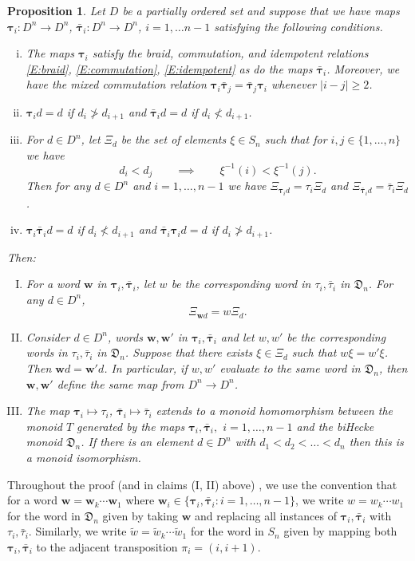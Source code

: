 \documentclass[11pt]{article}
\newcommand{\bw}{\mathbf{w}}
\newtheorem{proposition}[theorem]{Proposition}
\theoremstyle{definition} %
\theoremstyle{remark} %
\newcommand{\btau}{{\boldsymbol \tau}}
\newcommand{\bbtau}{\bar {\boldsymbol \tau}}
\begin{document}
\begin{proposition}
	\label{p:semigroup-isom}
	Let $D$ be a partially ordered set and suppose that we have maps $\btau_i:D^n \to D^n$, $\bbtau_i:D^n \to D^n$, $i=1,\ldots n-1$ satisfying the following conditions.
	\begin{enumerate}[(i)]
		\item The maps $\btau_i$ satisfy the braid, commutation, and idempotent relations \eqref{E:braid}, \eqref{E:commutation}, \eqref{E:idempotent} as do the maps $\bbtau_i$. Moreover, we have the mixed commutation relation $\btau_i \bbtau_j = \bbtau_j \btau_i$ whenever $|i-j| \ge 2$.
		\item $\btau_i d=d$ if $d_i \not > d_{i+1}$ and $\bbtau_i d=d$ if $d_i \not < d_{i+1}$.
		\item For $d \in D^n$, let $\Xi_d$ be the set of elements $\xi \in S_n$ such that for $i, j \in \{1, \dots, n\}$ we have
		$$
		d_{i} <d_{j} \qquad \implies \qquad \xi^{-1}(i) < \xi^{-1}(j).
		$$
		Then for any $d\in D^n$ and $i = 1, \dots, n - 1$ we have
		$\Xi_{\btau_i d}=\tau_i \Xi_d$ and $\Xi_{ \bbtau_i d}=\bar \tau_i \Xi_d$. 
		\item $\btau_i\bbtau_id=d$ if $d_i  \not < d_{i+1}$ and $\bbtau_i\btau_id=d$ if $d_i \not > d_{i+1}$.
	\end{enumerate}
	Then:
	\begin{enumerate}[(I)]
		\item For a word $\mathbf w$ in $\btau_i, \bbtau_i$, let $w$ be the corresponding word in $\tau_i, \bar\tau_i$ in $\mathfrak{D}_n$. For any $d\in D^n$,
		$$\Xi_{\mathbf wd}=w\Xi_d.$$
		\item Consider $d \in D^n$, words $\bw,\bw'$ in $\btau_i, \bbtau_i$ and let $w, w'$ be the corresponding words in $\tau_i, \bar\tau_i$ in $\mathfrak{D}_n$. Suppose that there exists $\xi \in \Xi_d$ such that $w \xi = w' \xi$. Then $\bw d=\bw'd$. In particular, if $w, w'$ evaluate to the same word in $\mathfrak{D}_n$, then $\bw, \bw'$ define the same map from $D^n \to D^n$.
		\item The map $\btau_i\mapsto \tau_i$, $\bbtau_i\mapsto \bar \tau_i$ extends to a monoid homomorphism between the monoid $T$ generated by the maps $\btau_i,\bbtau_i,$ $i=1,\ldots, n-1$ and the biHecke monoid $\mathfrak{D}_n$. If there is an element $d \in D^n$ with $d_1 < d_2 < \dots < d_n$ then this is a monoid isomorphism.
	\end{enumerate}
\end{proposition}

Throughout the proof (and in claims (I, II) above) , we use the convention that for a word $\bw = \bw_k \cdots \bw_1$ where $\bw_i \in \{\btau_i, \bbtau_i : i = 1, \dots, n-1\}$, we write $w = w_k \cdots w_1$ for the word in $\mathfrak{D}_n$ given by taking $\bw$ and replacing all instances of $\btau_i, \bbtau_i$ with $\tau_i, \bar \tau_i$. Similarly, we write $\tilde w = \tilde w_k \cdots \tilde w_1$ for the word in $S_n$ given by mapping both $\btau_i, \bbtau_i$ to the adjacent transposition $\pi_i = (i, i+1)$.
\end{document}
